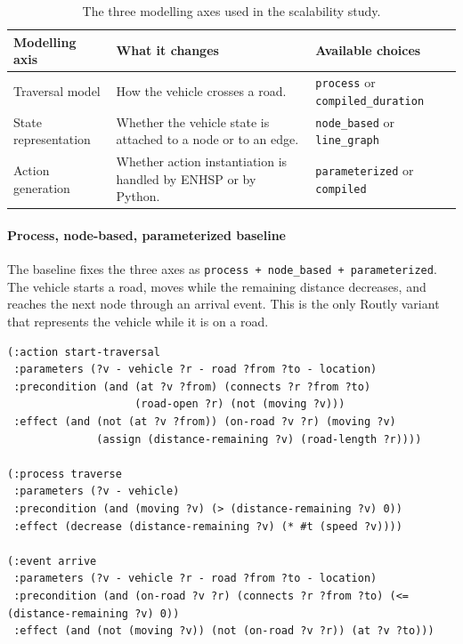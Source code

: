 \documentclass[10pt]{article}
\begin{document}
\begin{table}[H]
\centering
\caption{The three modelling axes used in the scalability study.}
\label{tab:model-axes}
\scriptsize
\begin{tabularx}{\linewidth}{@{}>{\raggedright\arraybackslash}p{2.35cm}>{\raggedright\arraybackslash}Y>{\raggedright\arraybackslash}p{3.15cm}@{}}
\toprule
Modelling axis & What it changes & Available choices \\
\midrule
Traversal model & How the vehicle crosses a road. & \texttt{process} or \texttt{compiled\_duration} \\
State representation & Whether the vehicle state is attached to a node or to an edge. & \texttt{node\_based} or \texttt{line\_graph} \\
Action generation & Whether action instantiation is handled by ENHSP or by Python. & \texttt{parameterized} or \texttt{compiled} \\
\bottomrule
\end{tabularx}
\end{table}

\paragraph{Process, node-based, parameterized baseline}
The baseline fixes the three axes as
\texttt{process + node\_based + parameterized}. The vehicle starts a road,
moves while the remaining distance decreases, and reaches the next node through
an arrival event. This is the only Routly variant that represents the vehicle
while it is on a road.

\begin{lstlisting}
(:action start-traversal
 :parameters (?v - vehicle ?r - road ?from ?to - location)
 :precondition (and (at ?v ?from) (connects ?r ?from ?to)
                    (road-open ?r) (not (moving ?v)))
 :effect (and (not (at ?v ?from)) (on-road ?v ?r) (moving ?v)
              (assign (distance-remaining ?v) (road-length ?r))))

(:process traverse
 :parameters (?v - vehicle)
 :precondition (and (moving ?v) (> (distance-remaining ?v) 0))
 :effect (decrease (distance-remaining ?v) (* #t (speed ?v))))

(:event arrive
 :parameters (?v - vehicle ?r - road ?from ?to - location)
 :precondition (and (on-road ?v ?r) (connects ?r ?from ?to) (<= (distance-remaining ?v) 0))
 :effect (and (not (moving ?v)) (not (on-road ?v ?r)) (at ?v ?to)))
\end{lstlisting}
\end{document}
